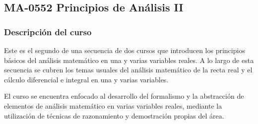 \newpage
\subsection*{MA-0552 Principios de Análisis II}

\hypertarget{MA0552}{}
\begin{refsection}
\begin{table}[H]
\end{table}



\subsubsection*{Descripción del curso}



Este es el segundo de una secuencia de dos cursos que introducen los principios básicos del análisis matemático en una y varias variables reales. A lo largo de esta secuencia se cubren los temas usuales del análisis matemático
de la recta real y el cálculo diferencial e integral en una y varias variables. 

El curso se encuentra enfocado al desarrollo del formalismo y la abstracción de elementos de análisis matemático en varias variables reales, mediante la utilización de técnicas de razonamiento y demostración propias del área.


\end{refsection}
